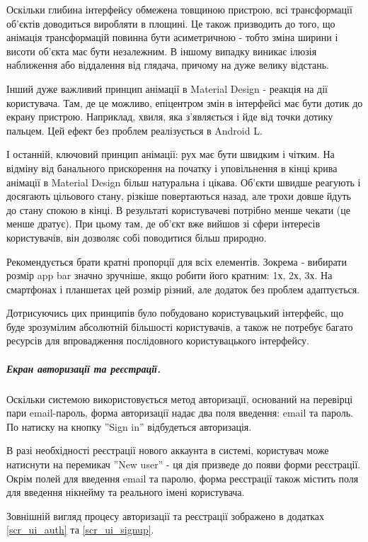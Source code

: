 \documentclass[../main.tex]{subfiles}
\begin{document}
			Оскільки глибина інтерфейсу обмежена товщиною пристрою, всі трансформації об'єктів доводиться виробляти в площині. Це також призводить до того, що анімація трансформацій повинна бути асиметричною - тобто зміна ширини і висоти об'єкта має бути незалежним. В іншому випадку виникає ілюзія наближення або віддалення від глядача, причому на дуже велику відстань.
			
			Інший дуже важливий принцип анімації в Material Design - реакція на дії користувача. Там, де це можливо, епіцентром змін в інтерфейсі має бути дотик до екрану пристрою. Наприклад, хвиля, яка з'являється і йде від точки дотику пальцем. Цей ефект без проблем реалізується в Android L.
			
			І останній, ключовий принцип анімації: рух має бути швидким і чітким. На відміну від банального прискорення на початку і уповільнення в кінці крива анімації в Material Design більш натуральна і цікава. Об'єкти швидше реагують і досягають цільового стану, різкіше повертаються назад, але трохи довше йдуть до стану спокою в кінці. В результаті користувачеві потрібно менше чекати (це менше дратує). При цьому там, де об'єкт вже вийшов зі сфери інтересів користувачів, він дозволяє собі поводитися більш природно.
			
			Рекомендується брати кратні пропорції для всіх елементів. Зокрема - вибирати розмір app bar значно зручніше, якщо робити його кратним: 1х, 2х, 3х. На смартфонах і планшетах цей розмір різний, але додаток без проблем адаптується.
			
			Дотрисуючись цих принципів було побудовано користувацький інтерфейс, що буде зрозумілим абсолютній більшості користувачів, а також не потребує багато ресурсів для впровадження послідовного користувацького інтерфейсу.
	
		\subparagraph{Екран авторизації та реєстрації.}
		
			Оскільки системою використовується метод авторизації, оснований на перевірці пари email-пароль, форма авторизації надає два поля введення: email та пароль. По натиску на кнопку ''Sign in'' відбудеться авторизація.
			
			В разі необхідності реєстрації нового аккаунта в системі, користувач може натиснути на перемикач ''New user'' - ця дія призведе до появи форми реєстрації. Окрім полей для введення email та паролю, форма реєстрації також містить поля для введення нікнейму та реального імені користувача.
			
			Зовнішній вигляд процесу авторизації та реєстрації зображено в додатках \ref{scr_ui_auth} та \ref{scr_ui_signup}.
	
\end{document}
